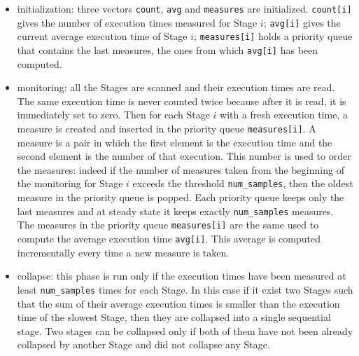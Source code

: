 \documentclass[12pt]{article}
\begin{document}
\begin{itemize}
\item initialization: three vectors \texttt{count}, \texttt{avg} and \texttt{measures} are initialized. \texttt{count[i]} gives the number of execution times measured for Stage $i$; \texttt{avg[i]} gives the current average execution time of Stage $i$; \texttt{measures[i]} holds a priority queue that contains the last measures, the ones from which \texttt{avg[i]} has been computed. 
\item monitoring: all the Stages are scanned and their execution times are read. The same execution time is never counted twice because after it is read, it is immediately set to zero. Then for each Stage $i$ with a fresh execution time, a measure is created and inserted in the priority queue \texttt{measures[i]}. A measure is a pair in which the first element is the execution time and the second element is the number of that execution. This number is used to order the measures: indeed if the number of measures taken from the beginning of the monitoring for Stage $i$ exceeds the threshold \texttt{num\_samples}, then the oldest measure in the priority queue is popped. Each priority queue keeps only the last measures and at steady state it keeps exactly \texttt{num\_samples} measures. The measures in the priority queue \texttt{measures[i]} are the same used to compute the average execution time \texttt{avg[i]}. This average is computed incrementally every time a new measure is taken. 
\item collapse: this phase is run only if the execution times have been measured at least \texttt{num\_samples} times for each Stage. In this case if it exist two Stages such that the sum of their average execution times is smaller than the execution time of the slowest Stage, then they are collapsed into a single sequential stage. Two stages can be collapsed only if both of them have not been already collapsed by another Stage and did not collapse any Stage.
\end{itemize}
\end{document}
